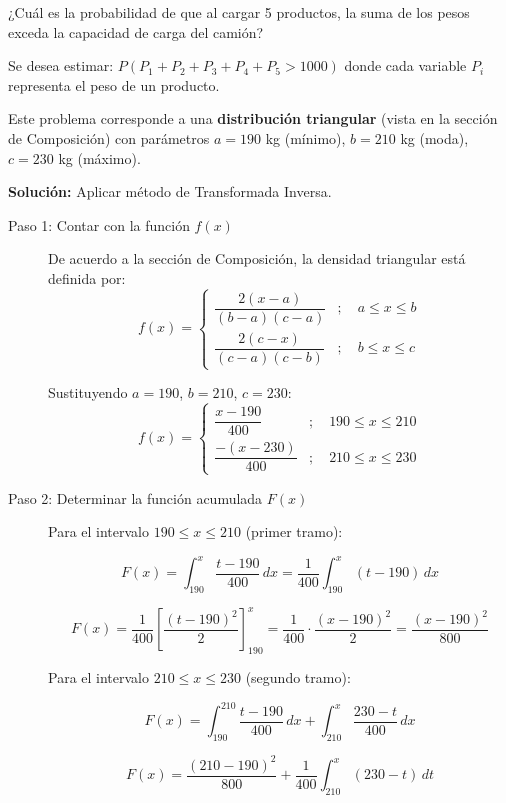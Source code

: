 \documentclass{article}
\begin{document}
¿Cuál es la probabilidad de que al cargar 5 productos, la suma de los pesos exceda la capacidad de carga del camión?

Se desea estimar: $P(P_1+P_2+P_3+P_4+P_5 > 1000)$ donde cada variable $P_i$ representa el peso de un producto.

Este problema corresponde a una \textbf{distribución triangular} (vista en la sección de Composición) con parámetros $a=190$ kg (mínimo), $b=210$ kg (moda), $c=230$ kg (máximo).

\textbf{Solución:} Aplicar método de Transformada Inversa.

\begin{description}
    \item[Paso 1: Contar con la función $f(x)$]
    
    De acuerdo a la sección de Composición, la densidad triangular está definida por:
    \[
    f(x)=
    \begin{cases}
    \dfrac{2(x-a)}{(b-a)(c-a)}
    & ; \quad a \le x \le b \\[10pt]
    
    \dfrac{2(c-x)}{(c-a)(c-b)}
    & ; \quad b \le x \le c
    \end{cases}
    \]
    
    Sustituyendo $a=190$, $b=210$, $c=230$:
    \[
    f(x)=
    \begin{cases}
    \dfrac{x-190}{400}
    & ; \quad 190 \le x \le 210 \\[10pt]
    
    \dfrac{-(x-230)}{400}
    & ; \quad 210 \le x \le 230
    \end{cases}
    \]

    \item[Paso 2: Determinar la función acumulada $F(x)$]
    
    Para el intervalo $190 \le x \le 210$ (primer tramo):

\[
F(x)
=
\int_{190}^{x}
\dfrac{t-190}{400}\,dx
=
\frac{1}{400}\int_{190}^{x}(t-190)\,dx
\]

\[
F(x)
=
\frac{1}{400}\left[\frac{(t-190)^2}{2}\right]_{190}^{x}
=
\frac{1}{400} \cdot \frac{(x-190)^2}{2}
=
\frac{(x-190)^2}{800}
\]

Para el intervalo $210 \le x \le 230$ (segundo tramo):

\[
F(x)
=
\int_{190}^{210}\dfrac{t-190}{400}\,dx
+
\int_{210}^{x}
\dfrac{230-t}{400}\,dx
\]

\[
F(x)
=
\frac{(210-190)^2}{800}
+
\frac{1}{400}\int_{210}^{x}(230-t)\,dt
\]


\end{description}
\end{document}
